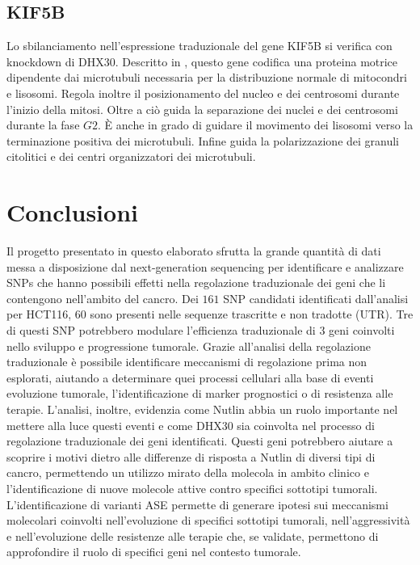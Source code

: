 	\subsection{KIF5B}
	Lo sbilanciamento nell'espressione traduzionale del gene KIF5B si verifica con knockdown di DHX30.
	Descritto in \cite{kif5b}, questo gene codifica una proteina motrice dipendente dai microtubuli necessaria per la distribuzione normale di mitocondri e lisosomi.
	Regola inoltre il posizionamento del nucleo e dei centrosomi durante l'inizio della mitosi.
	Oltre a ci\`o guida la separazione dei nuclei e dei centrosomi durante la fase $G2$.
	\`E anche in grado di guidare il movimento dei lisosomi verso la terminazione positiva dei microtubuli.
	Infine guida la polarizzazione dei granuli citolitici e dei centri organizzatori dei microtubuli.

\section{Conclusioni}
\label{sec:ending}
Il progetto presentato in questo elaborato sfrutta la grande quantit\`a di dati messa a disposizione dal next-generation sequencing per identificare e analizzare SNPs che hanno possibili effetti nella regolazione traduzionale dei geni che li contengono nell’ambito del cancro. 
Dei $161$ SNP candidati identificati dall'analisi per HCT116, $60$ sono presenti nelle sequenze trascritte e non tradotte (UTR).
Tre di questi SNP potrebbero modulare l'efficienza traduzionale di $3$ geni coinvolti nello sviluppo e progressione tumorale.
Grazie all’analisi della regolazione traduzionale \`e possibile identificare meccanismi di regolazione prima non esplorati, aiutando a determinare quei processi cellulari alla base di eventi evoluzione tumorale, l'identificazione di marker prognostici o di resistenza alle terapie.
L'analisi, inoltre, evidenzia come Nutlin abbia un ruolo importante nel mettere alla luce questi eventi e come DHX30 sia coinvolta nel processo di regolazione traduzionale dei geni identificati. 
Questi geni potrebbero aiutare a scoprire i motivi dietro alle differenze di risposta a Nutlin di diversi tipi di cancro, permettendo un utilizzo mirato della molecola in ambito clinico e l'identificazione di nuove molecole attive contro specifici sottotipi tumorali.
L'identificazione di varianti ASE permette di generare ipotesi sui meccanismi molecolari coinvolti nell'evoluzione di specifici sottotipi tumorali, nell'aggressivit\`a e nell'evoluzione delle resistenze alle terapie che, se validate, permettono di approfondire il ruolo di specifici geni nel contesto tumorale. 
